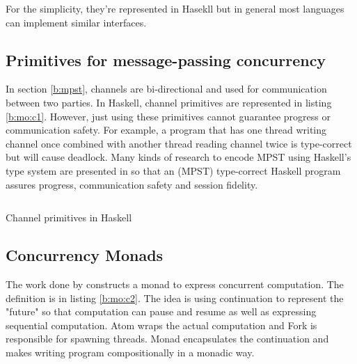 For the simplicity, they're represented in Hasekll but in general most languages can implement similar interfaces. 
\subsection{Primitives for message-passing concurrency} \label{b:mo:mpc}
In section \ref{b:mpst}, channels are bi-directional and used for communication between two parties. In Haskell, channel primitives are represented in listing \ref{b:mo:c1}. However, just using these primitives cannot guarantee progress or communication safety. For example, a program that has one thread writing channel once combined with another thread reading channel twice is type-correct but will cause deadlock. Many kinds of research to encode MPST using Haskell's type system are presented in \cite{orchardSessionTypesLinearity} so that an (MPST) type-correct Haskell program assures progress, communication safety and session fidelity.
\begin{listing}[ht]
  \inputminted{haskell}{background/mo-chan.hs}
  \caption{Channel primitives in Haskell}
  \label{b:mo:c1}
\end{listing}
\subsection{Concurrency Monads}
The work done by \cite{claessenFunctionalPearlsPoor1999} constructs a monad to express concurrent computation. The definition is in listing \ref{b:mo:c2}. The idea is using continuation to represent the "future" so that computation can pause and resume as well as expressing sequential computation. Atom wraps the actual computation and Fork is responsible for spawning threads. Monad encapsulates the continuation and makes writing program compositionally in a monadic way.

